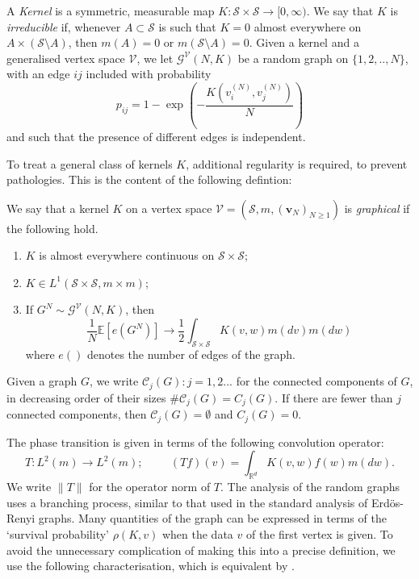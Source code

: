 \begin{definition}
    A \emph{Kernel} is a symmetric, measurable map $K: \mathcal{S}\times \mathcal{S} \rightarrow [0, \infty).$ We say that $K$ is \emph{irreducible} if, whenever $A\subset \mathcal{S}$ is such that $K=0$ almost everywhere on $A\times (\mathcal{S}\setminus A)$, then $m(A)=0$ or $m(\mathcal{S}\setminus A)=0$. 
    Given a kernel and a generalised vertex space $\mathcal{V}$, we let
    $\mathcal{G}^\mathcal{V}(N,K)$ be a random graph on $\{1, 2,..,N\}$, with an edge $ij$ included with probability \begin{equation}
        p_{ij}=1-\exp\left(-\frac{K(v^{(N)}_i,v^{(N)}_j)}{N} \right)
    \end{equation} and such that the presence of different edges is independent.   
\end{definition} To treat a general class of kernels $K$, additional regularity is required, to prevent pathologies. This is the content of the following defintion: \begin{definition}
    We say that a kernel $K$ on a vertex space $\mathcal{V}=(\mathcal{S}, m, (\mathbf{v}_N)_{N\geq 1})$ is \emph{graphical} if the following hold. 
    \begin{enumerate}[label=\roman{*}).]
        \item $K$ is almost everywhere continuous on $\mathcal{S}\times\mathcal{S};$
        \item $K \in L^1(\mathcal{S}\times \mathcal{S}, m \times m)$;
        \item If $G^N \sim \mathcal{G}^\mathcal{V}(N,K)$, then
        \begin{equation}
            \frac{1}{N}\mathbb{E}\left[e\left(G^N\right)\right]\rightarrow \frac{1}{2}\int_{\mathcal{S}\times \mathcal{S}} K(v,w)m(dv)m(dw)
        \end{equation} where $e()$ denotes the number of edges of the graph.
    \end{enumerate}
\end{definition}  \begin{definition}
 Given a graph $G$, we write $\mathcal{C}_j(G): j=1, 2...$ for the connected components of $G$, in decreasing order of their sizes $\#\mathcal{C}_j(G)=C_j(G)$. If there are fewer than $j$ connected components, then $\mathcal{C}_j(G)=\emptyset$ and $C_j(G)=0$.
\end{definition}The phase transition is given in terms of the following convolution operator:
\begin{equation}\label{eq: T}
       T: L^2(m)\rightarrow L^2(m); \hspace{1cm} (T f)(v)=\int_{\mathbb{R}^d} K(v,w)f(w)m(dw). 
   \end{equation}  We write $\|T\|$ for the operator norm of $T$.  The analysis of the random graphs uses a branching process, similar to that used in the standard analysis of Erd\"os-Renyi graphs. Many quantities of the graph can be expressed in terms of the `survival probability' $\rho(K, v)$ when the data $v$ of the first vertex is given. To avoid the unnecessary complication of making this into a precise definition, we use the following characterisation, which is equivalent by \cite[Theorem 6.2]{BJR07}.
